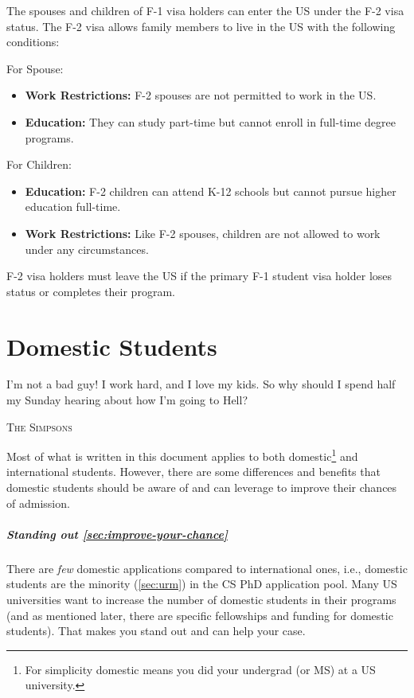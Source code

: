 \documentclass[oneside,11pt,dvipsnames]{book}
\def\chapterinfo#1{%
  \addcontentsline{toc}{chapterinfo}{%
    \noexpand\numberline{}\color{black}{#1}}%
}
\begin{document}
The spouses and children of F-1 visa holders can enter the US under the F-2 visa status. The F-2 visa allows family members to live in the US with the following conditions:

For Spouse: 
\begin{itemize}
\item \textbf{Work Restrictions:} F-2 spouses are not permitted to work in the US.
\item \textbf{Education:} They can study part-time but cannot enroll in full-time degree programs.
\end{itemize}
For Children:
\begin{itemize}
\item \textbf{Education:} F-2 children can attend K-12 schools but cannot pursue higher education full-time.
\item \textbf{Work Restrictions:} Like F-2 spouses, children are not allowed to work under any circumstances.
\end{itemize}
F-2 visa holders must leave the US if the primary F-1 student visa holder loses status or completes their program.

\chapter{Domestic Students}\label{sec:domestic-students}
\chapterinfo{Specific benefits and opportunities for domestic students applying to CS PhD programs.}

\epigraph{\vspace{-0.2in} I’m not a bad guy! I work hard, and I love my kids. So why should I spend half my Sunday hearing about how I’m going to Hell?}{\textsc{The Simpsons}}

Most of what is written in this document applies to both domestic\footnote{For simplicity domestic means you did your undergrad (or MS) at a US university.} and international students.  However, there are some differences and benefits that domestic students should be aware of and can leverage to improve their chances of admission.

\paragraph{Standing out \autoref{sec:improve-your-chance}} There are \emph{few} domestic applications compared to international ones, i.e., domestic students are the minority (\autoref{sec:urm}) in the CS PhD application pool. Many US universities want to increase the number of domestic students in their programs (and as mentioned later, there are specific fellowships and funding for domestic students).
That makes you stand out and can help your case.
\end{document}
